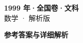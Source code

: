\documentclass[zihao=-4, a4paper]{ctexart}
\begin{document}
\begin{center}
  {\Large\bfseries 1999 年·全国卷·文科}\\[4pt]
  {\large 数学 · 解析版}
\end{center}
\medskip
{}

\clearpage
{}
\begin{center}{\Large\bfseries 参考答案与详细解析}\end{center}
\medskip

\end{document}

